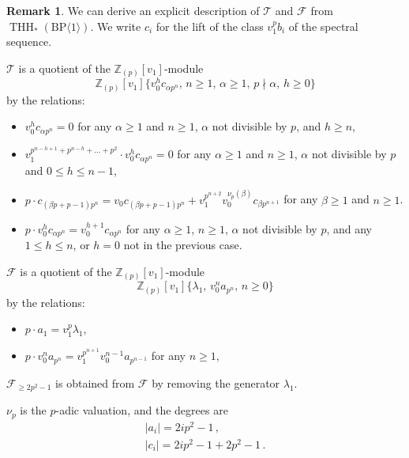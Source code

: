 \documentclass[11pt]{amsart}
\newcommand{\mr}[1]{\mathrm{#1}}
\newcommand{\Z}{\mathbb{Z}}
\newcommand{\BP}{\mr{BP}}
\DeclareMathOperator{\THH}{THH}
\theoremstyle{definition}
\newtheorem{remark}[equation]{Remark}
\numberwithin{equation}{section}
\numberwithin{figure}{section}
\begin{document}
\begin{remark}
  We can derive an explicit description of $\mathcal{T}$  and $\mathcal{F}$ from $\THH_*(\BP \langle 1 \rangle)$. We write $c_i$ for the lift of the class $v_1^p b_i$ of the spectral sequence.

  $\mathcal{T}$ is a quotient of the $\Z_{(p)}[v_1]$-module
  \[
    \Z_{(p)}[v_1]\{v_0^h c_{\alpha p^n
    },\, n\geq 1,\, \alpha\geq 1,\, p\nmid \alpha,\, h \geq 0\}
  \]
  by the relations:
  \begin{itemize}
  \item $v_0^{h} c_{\alpha p^n} = 0$ for any $\alpha \geq 1$ and $n \geq 1$, $\alpha$ not divisible by $p$, and $h \geq n$,
  \item $v_1^{p^{n-h+1}+p^{n-h}+\dots+p^2 }\cdot v_0^h c_{\alpha p^n} = 0$ for any $\alpha \geq 1$ and $n \geq 1$, $\alpha$ not divisible by $p$ and  $0 \leq h \leq n - 1$,
  \item $p\cdot c_{(\beta p+p-1)p^n} = v_0 c_{(\beta p+p-1)p^n}+v_1^{p^{n+2}}v_0^{\nu_p(\beta)} c_{\beta p^{n+1}}$ for any $\beta \geq 1$ and $n \geq 1$.
  \item $p\cdot v_0^h c_{\alpha p^n} = v_0^{h+1} c_{\alpha p^n}$ for any $\alpha \geq 1$, $n \geq 1$, $\alpha$ not divisible by $p$, and any $1 \leq h \leq n$, or $h=0$ not in the previous case.
  \end{itemize}

  $\mathcal{F}$ is a quotient of the $\Z_{(p)}[v_1]$-module
  \[
    \Z_{(p)}[v_1]\{\lambda_1,\, v_0^n a_{p^n},\,n\geq 0\} 
  \]
    by the relations:
  \begin{itemize}
  \item $p\cdot a_1 = v_1^p \lambda_1$,
  \item $p\cdot v_0^n a_{p^n} = v_1^{p^{n+1}}v_0^{n-1} a_{p^{n-1}}$ for any $n\geq 1$,
  \end{itemize}
  $\mathcal{F}_{\geq 2p^2 -1}$ is obtained from $\mathcal{F}$ by removing the generator $\lambda_1$.

  $\nu_p$ is the $p$-adic valuation, and the degrees are
  \[
    \begin{gathered}
      |a_i| = 2ip^2 - 1 \,, \\
      |c_i| = 2ip^2 - 1 + 2p^2 - 1 \,.
    \end{gathered}
  \]
\end{remark}
\end{document}
